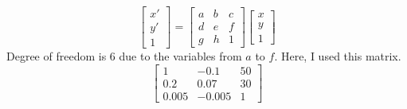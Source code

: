\documentclass{article}
\begin{document}
$$ \begin{bmatrix}
    x' \\ y' \\ 1
    \end{bmatrix}
    =
    \begin{bmatrix}
    a & b & c \\
    d & e & f \\
    g & h & 1
    \end{bmatrix}
    \begin{bmatrix}
    x \\ y \\ 1
\end{bmatrix} $$
Degree of freedom is 6 due to the variables from $a$ to $f$.
Here, I used this matrix.
$$ 
\begin{bmatrix}
    1 & -0.1 & 50 \\
    0.2 & 0.07 & 30 \\
    0.005 & -0.005 & 1
\end{bmatrix} 
$$
\end{document}

